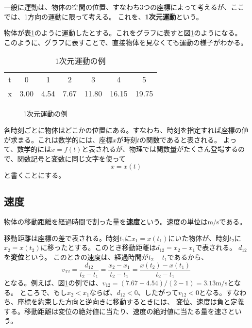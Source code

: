 \documentclass[a4paper, uplatex]{jsarticle}
\numberwithin{equation}{section}
\numberwithin{figure}{section}
\numberwithin{table}{section}
\begin{document}
一般に運動は、物体の空間の位置、すなわち3つの座標によって考えるが、ここでは、1方向の運動に限って考える。
これを、\textbf{1次元運動}という。

物体が表\ref{tab:1d-motion}のように運動したとする。これをグラフに表すと図\ref{fig:1d-motion}のようになる。
このように、グラフに表すことで、直接物体を見なくても運動の様子がわかる。

\begin{table}[htbp]
  \centering
  \caption{1次元運動の例}\label{tab:1d-motion}
  \begin{tabular}{ccccccc}
  \toprule
  t & 0    & 1    & 2    & 3     & 4     & 5     \\
  x & 3.00 & 4.54 & 7.67 & 11.80 & 16.15 & 19.75 \\ \bottomrule
  \end{tabular}
\end{table}

\begin{figure}[htbp]
\centering
{}
\caption{1次元運動の例}\label{fig:1d-motion}
\end{figure}

各時刻ごとに物体はどこかの位置にある。すなわち、時刻を指定すれば座標の値が求まる。これは数学的には、座標\(x\)が時刻\(t\)の関数であると表される。
よって、数学的には\(x=f(t)\)と表されるが、物理では関数量がたくさん登場するので、関数記号と変数に同じ文字を使って
\begin{equation}
  x = x(t)
  \label{eq:1d-function}
\end{equation}
と書くことにする。

\subsection{速度}

物体の移動距離を経過時間で割った量を\textbf{速度}という。速度の単位はm/sである。

移動距離は座標の差で表される。時刻\(t_1\)に\(x_1=x(t_1)\)にいた物体が、時刻\(t_2\)に\(x_2=x(t_2)\)に移ったとする。このとき移動距離は\(d_{12}=x_2-x_1\)で表される。
\(d_{12}\)を\textbf{変位}という。
このときの速度は、経過時間が\(t_2-t_1\)であるから、
\begin{equation}
  v_{12} = \frac{d_{12}}{t_2-t_1} = \frac{x_2-x_1}{t_2-t_1} = \frac{x(t_2)-x(t_1)}{t_2-t_1}
  \label{eq:1d-motion}
\end{equation}
となる。例えば、図\ref{fig:1d-motion}の例では、\(v_{12}=(7.67 - 4.54)/(2 - 1)=3.13\mathrm{m/s}\)となる。
ところで、もし\(x_2<x_1\)ならば、\(d_{12}<0\)、したがって\(v_{12}<0\)となる。すなわち、座標を約束した方向と逆向きに移動するときには、
変位、速度は負と定義する。移動距離は変位の絶対値に当たり、速度の絶対値に当たる量を速さという。
\end{document}

